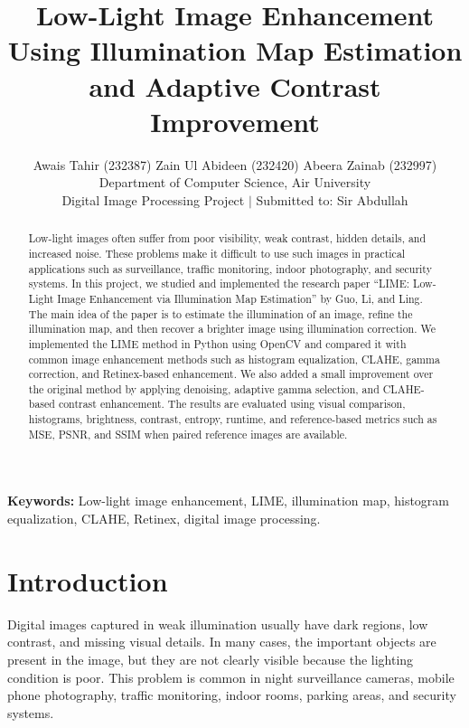 \documentclass[11pt]{article}
\begin{document}
\title{Low-Light Image Enhancement Using Illumination Map Estimation and Adaptive Contrast Improvement}

\author{
Awais Tahir (232387) \quad Zain Ul Abideen (232420) \quad Abeera Zainab (232997)\\[0.4em]
Department of Computer Science, Air University\\
Digital Image Processing Project \quad $\vert$ \quad Submitted to: Sir Abdullah
}
\date{}

\maketitle

\begin{abstract}
Low-light images often suffer from poor visibility, weak contrast, hidden details, and increased noise. These problems make it difficult to use such images in practical applications such as surveillance, traffic monitoring, indoor photography, and security systems. In this project, we studied and implemented the research paper ``LIME: Low-Light Image Enhancement via Illumination Map Estimation'' by Guo, Li, and Ling. The main idea of the paper is to estimate the illumination of an image, refine the illumination map, and then recover a brighter image using illumination correction. We implemented the LIME method in Python using OpenCV and compared it with common image enhancement methods such as histogram equalization, CLAHE, gamma correction, and Retinex-based enhancement. We also added a small improvement over the original method by applying denoising, adaptive gamma selection, and CLAHE-based contrast enhancement. The results are evaluated using visual comparison, histograms, brightness, contrast, entropy, runtime, and reference-based metrics such as MSE, PSNR, and SSIM when paired reference images are available.
\end{abstract}

\noindent\textbf{Keywords:} Low-light image enhancement, LIME, illumination map, histogram equalization, CLAHE, Retinex, digital image processing.

\vspace{0.6em}

\section{Introduction}
Digital images captured in weak illumination usually have dark regions, low contrast, and missing visual details. In many cases, the important objects are present in the image, but they are not clearly visible because the lighting condition is poor. This problem is common in night surveillance cameras, mobile phone photography, traffic monitoring, indoor rooms, parking areas, and security systems.
\end{document}

